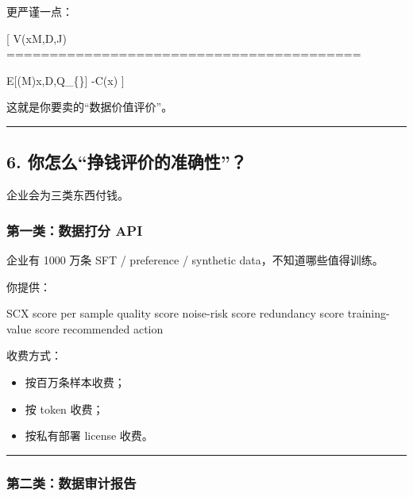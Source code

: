 \documentclass[
  12pt,
]{ctexart}
\newenvironment{Shaded}{}{}
\newcommand{\NormalTok}[1]{#1}
\providecommand{\tightlist}{%
  \setlength{\itemsep}{0pt}\setlength{\parskip}{0pt}}
\begin{document}
更严谨一点：

{[} V(x\mid \mathcal M,\mathcal D,\mathcal J)
=========================================

\mathbb E{[}\Delta {}(\mathcal M)\mid x,\mathcal D,Q\_\{\}{]}
-\lambda C(x) {]}

这就是你要卖的``数据价值评价''。

\begin{center}\rule{0.5\linewidth}{0.5pt}\end{center}

\subsection{6.
你怎么``挣钱评价的准确性''？}\label{ux4f60ux600eux4e48ux6323ux94b1ux8bc4ux4ef7ux7684ux51c6ux786eux6027}

企业会为三类东西付钱。

\subsubsection{第一类：数据打分
API}\label{ux7b2cux4e00ux7c7bux6570ux636eux6253ux5206-api}

企业有 1000 万条 SFT / preference / synthetic data，不知道哪些值得训练。

你提供：

\begin{Shaded}
\begin{Highlighting}[]
\NormalTok{SCX score per sample}
\NormalTok{quality score}
\NormalTok{noise{-}risk score}
\NormalTok{redundancy score}
\NormalTok{training{-}value score}
\NormalTok{recommended action}
\end{Highlighting}
\end{Shaded}

收费方式：

\begin{itemize}
\tightlist
\item
  按百万条样本收费；
\item
  按 token 收费；
\item
  按私有部署 license 收费。
\end{itemize}

\begin{center}\rule{0.5\linewidth}{0.5pt}\end{center}

\subsubsection{第二类：数据审计报告}\label{ux7b2cux4e8cux7c7bux6570ux636eux5ba1ux8ba1ux62a5ux544a}
\end{document}
